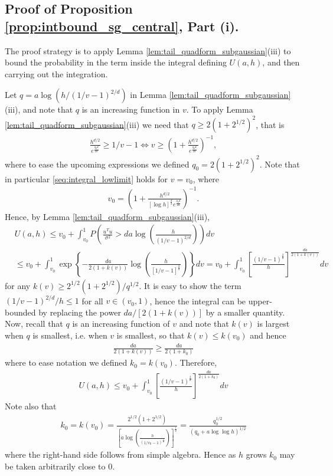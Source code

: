 \subsection{Proof of Proposition \ref{prop:intbound_sg_central}, Part (i).}

The proof strategy is to apply Lemma \ref{lem:tail_quadform_subgaussian}(iii) to bound the probability in the term inside the integral defining $U(a,h)$, and then carrying out the integration.


Let $q= a \log(h/(1/v-1)^{2/d})$ in Lemma \ref{lem:tail_quadform_subgaussian}(iii), and note that $q$ is an increasing function in $v$.
To apply Lemma \ref{lem:tail_quadform_subgaussian}(iii) we need that $q \geq 2(1+2^{1/2})^2$, that is
\begin{align}
 \frac{h^{d/2}}{e^{\frac{q_0d}{2a}}} \geq 1/v -1 \Longleftrightarrow
v \geq \left( 1 + \frac{h^{d/2}}{e^{\frac{q_0d}{2a}}} \right)^{-1},
\label{seq:integral_lowlimit}
\end{align}
where to ease the upcoming expressions we defined $q_0=2(1+2^{1/2})^2$.
Note that in particular \eqref{seq:integral_lowlimit} holds for $v=v_0$, where
\begin{align}
 v_0= \left( 1 + \frac{h^{d/2}}{[\log h]^{\frac{d}{2}} e^{\frac{q_0d}{2a}}} \right)^{-1}.
\nonumber
\end{align}
Hence, by Lemma \ref{lem:tail_quadform_subgaussian}(iii),
\begin{align}
& U(a,h) \leq v_0 + \int_{v_0}^1 P \left( \frac{u^Tu}{\sigma^2} > d a \log \left( \frac{h}{(1/v-1)^{2/d}} \right) \right) dv
\nonumber \\
&\leq v_0 + \int_{v_0}^1 \exp \left\{  -\frac{da}{2(1+k(v))} \log \left( \frac{h}{[1/v-1]^{\frac{2}{d}}} \right)  \right\} dv
= v_0 + \int_{v_0}^1 \left[ \frac{(1/v-1)^{\frac{2}{d}}}{h} \right]^{\frac{da}{2(1+k(v))}} dv
\nonumber
\end{align}
for any $k(v) \geq 2^{1/2}(1+2^{1/2})/q^{1/2}$. 
It is easy to show the term $(1/v-1)^{2/d}/h \leq 1$ for all $v \in (v_0,1)$, hence the integral can be upper-bounded by replacing the power $da/[2(1+k(v))]$ by a smaller quantity.
Now, recall that $q$ is an increasing function of $v$ and note that $k(v)$ is largest when $q$ is smallest, i.e. when $v$ is smallest, so that $k(v) \leq k(v_0)$ 
and hence
\begin{align}
 \frac{da}{2(1+k(v))} \geq \frac{da}{2(1+k_0)}
\nonumber
\end{align}
where to ease notation we defined $k_0=k(v_0)$.
Therefore,
\begin{align}
 U(a,h) \leq v_0 + \int_{v_0}^1 \left[ \frac{(1/v-1)^{\frac{2}{d}}}{h} \right]^{\frac{da}{2(1+k_0)}} dv
\label{seq:int_bound1}
\end{align}
Note also that 
\begin{align}
k_0= k(v_0)= \frac{2^{1/2}(1+2^{1/2})}{\left[ a \log \left( \frac{h}{(1/v_0-1)^{\frac{2}{d}}} \right) \right]^{\frac{1}{2}}}
= \frac{q_0^{1/2}}{(q_0 + a \log\log h)^{1/2}}
\nonumber
\end{align}
where the right-hand side follows from simple algebra. Hence as $h$ grows $k_0$ may be taken arbitrarily close to 0.

